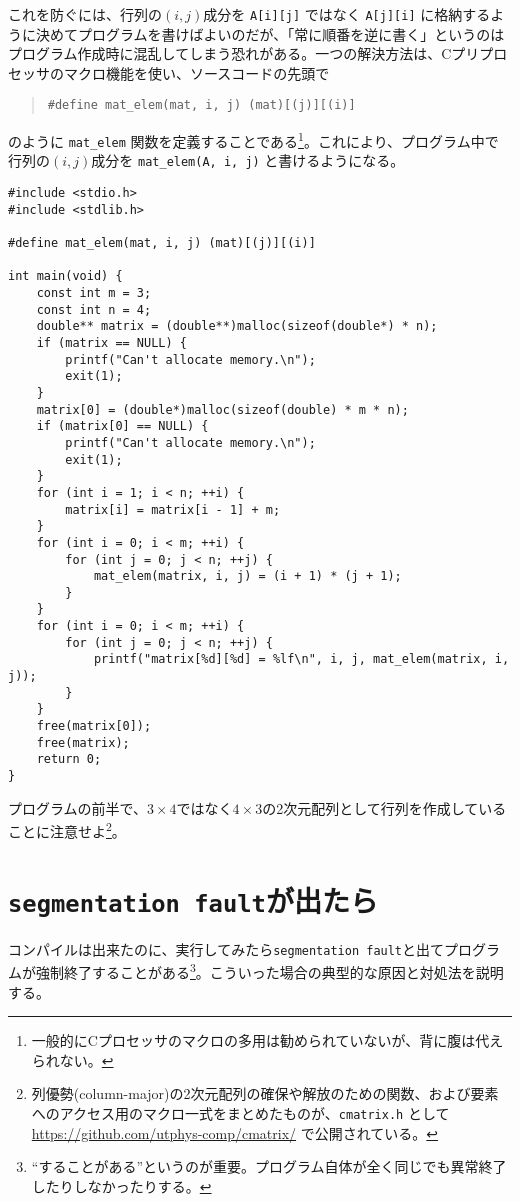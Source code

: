 これを防ぐには、行列の\((i,j)\)成分を \texttt{A[i][j]} ではなく \texttt{A[j][i]} に格納するように決めてプログラムを書けばよいのだが、「常に順番を逆に書く」というのはプログラム作成時に混乱してしまう恐れがある。一つの解決方法は、Cプリプロセッサのマクロ機能を使い、ソースコードの先頭で
\begin{quote}
    \begin{verbatim}
#define mat_elem(mat, i, j) (mat)[(j)][(i)]
\end{verbatim}
\end{quote}
のように \texttt{mat\_elem} 関数を定義することである\footnote{一般的にCプロセッサのマクロの多用は勧められていないが、背に腹は代えられない。}。これにより、プログラム中で行列の\((i,j)\)成分を \texttt{mat\_elem(A, i, j)} と書けるようになる。
\begin{reidai}\label{ex:malloc-2dim-column-major}
    \begin{verbatim}
#include <stdio.h>
#include <stdlib.h>

#define mat_elem(mat, i, j) (mat)[(j)][(i)]

int main(void) {
    const int m = 3;
    const int n = 4;
    double** matrix = (double**)malloc(sizeof(double*) * n);
    if (matrix == NULL) {
        printf("Can't allocate memory.\n");
        exit(1);
    }
    matrix[0] = (double*)malloc(sizeof(double) * m * n);
    if (matrix[0] == NULL) {
        printf("Can't allocate memory.\n");
        exit(1);
    }
    for (int i = 1; i < n; ++i) {
        matrix[i] = matrix[i - 1] + m;
    }
    for (int i = 0; i < m; ++i) {
        for (int j = 0; j < n; ++j) {
            mat_elem(matrix, i, j) = (i + 1) * (j + 1);
        }
    }
    for (int i = 0; i < m; ++i) {
        for (int j = 0; j < n; ++j) {
            printf("matrix[%d][%d] = %lf\n", i, j, mat_elem(matrix, i, j));
        }
    }
    free(matrix[0]);
    free(matrix);
    return 0;
}
\end{verbatim}
\end{reidai} \noindent
プログラムの前半で、\(3 \times 4\)ではなく\(4 \times 3\)の2次元配列として行列を作成していることに注意せよ\footnote{列優勢(column-major)の2次元配列の確保や解放のための関数、および要素へのアクセス用のマクロ一式をまとめたものが、\hypertarget{cmatrix}{\texttt{cmatrix.h}} として\url{https://github.com/utphys-comp/cmatrix/} で公開されている。}。

\section{\texttt{segmentation fault}が出たら}
コンパイルは出来たのに、実行してみたら\texttt{segmentation fault}と出てプログラムが強制終了することがある\footnote{``することがある''というのが重要。プログラム自体が全く同じでも異常終了したりしなかったりする。}。こういった場合の典型的な原因と対処法を説明する。

